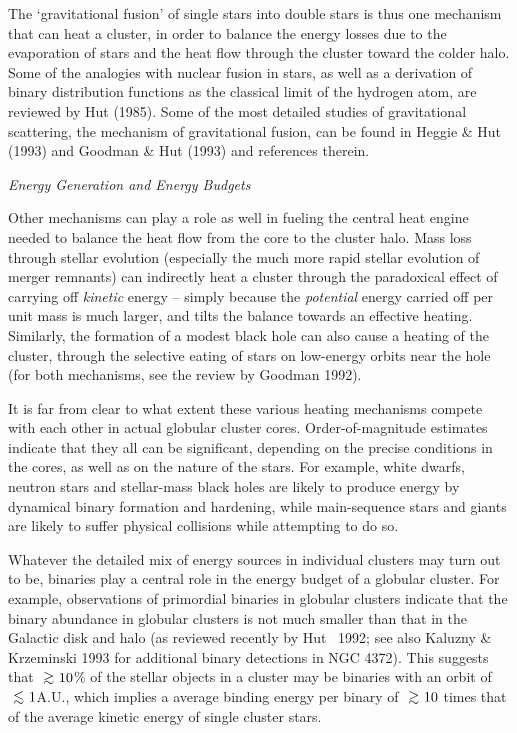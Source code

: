 The `gravitational fusion' of single stars into double stars is thus
one mechanism that can heat a cluster, in order to balance the energy
losses due to the evaporation of stars and the heat flow through the
cluster toward the colder halo.  Some of the analogies with nuclear
fusion in stars, as well as a derivation of binary distribution
functions as the classical limit of the hydrogen atom, are reviewed by
Hut (1985).  Some of the most detailed studies of gravitational
scattering, the mechanism of gravitational fusion, can be found in
Heggie \& Hut (1993) and Goodman \& Hut (1993) and references therein.

\bigskip
\noindent
{\it Energy Generation and Energy Budgets}
\medskip

Other mechanisms can play a role as well in fueling the central heat
engine needed to balance the heat flow from the core to the cluster
halo.  Mass loss through stellar evolution (especially the much more
rapid stellar evolution of merger remnants) can indirectly heat a
cluster through the paradoxical effect of carrying off {\sl kinetic}
energy -- simply because the {\sl potential} energy carried off per
unit mass is much larger, and tilts the balance towards an effective
heating.  Similarly, the formation of a modest black hole can also
cause a heating of the cluster, through the selective eating of stars
on low-energy orbits near the hole (for both mechanisms, see the
review by Goodman 1992).

It is far from clear to what extent these various heating mechanisms
compete with each other in actual globular cluster cores.
Order-of-magnitude estimates indicate that they all can be
significant, depending on the precise conditions in the cores, as well
as on the nature of the stars.  For example, white dwarfs, neutron
stars and stellar-mass black holes are likely to produce energy by
dynamical binary formation and hardening, while main-sequence stars
and giants are likely to suffer physical collisions while attempting
to do so.

Whatever the detailed mix of energy sources in individual clusters may
turn out to be, binaries play a central role in the energy budget of a
globular cluster.  For example, observations of primordial binaries in
globular clusters indicate that the binary abundance in globular
clusters is not much smaller than that in the Galactic disk and halo
(as reviewed recently by Hut \etal\ 1992; see also Kaluzny \&
Krzeminski 1993 for additional binary detections in NGC 4372).  This
suggests that $\simgt 10$\% of the stellar objects in a cluster may be
binaries with an orbit of $\simlt 1$A.U., which implies a average
binding energy per binary of $\simgt 10$ times that of the average
kinetic energy of single cluster stars.

